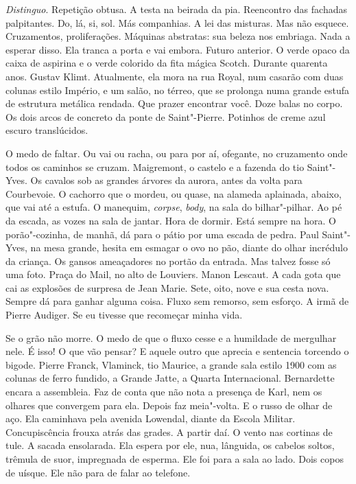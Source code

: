 \emph{Distinguo}. Repetição obtusa. A testa na beirada da pia.
Reencontro das fachadas palpitantes. Do, lá, si, sol. Más companhias. A %
lei das misturas. Mas não esquece. Cruzamentos, proliferações. Máquinas
abstratas: sua beleza nos embriaga. Nada a esperar disso. Ela tranca a
porta e vai embora. Futuro anterior. O verde opaco da caixa de aspirina
e o verde colorido da fita mágica Scotch. Durante quarenta anos. Gustav
Klimt. Atualmente, ela mora na rua Royal, num casarão com duas colunas
estilo Império, e um salão, no térreo, que se prolonga numa grande
estufa de estrutura metálica rendada. Que prazer encontrar você. Doze
balas no corpo. Os dois arcos de concreto da ponte de Saint"-Pierre.
Potinhos de creme azul escuro translúcidos.

O medo de faltar. Ou vai ou racha, ou para por aí, ofegante, no
cruzamento onde todos os caminhos se cruzam. Maigremont, o castelo e a
fazenda do tio Saint"-Yves. Os cavalos sob as grandes árvores da aurora,
antes da volta para Courbevoie. O cachorro que o mordeu, ou quase, na
alameda aplainada, abaixo, que vai até a estufa. O manequim,
\emph{corpse}, \emph{body}, na sala do bilhar"-pilhar. Ao pé da escada,
as vozes na sala de jantar. Hora de dormir. Está sempre na hora. O
porão"-cozinha, de manhã, dá para o pátio por uma escada de pedra. Paul
Saint"-Yves, na mesa grande, hesita em esmagar o ovo no pão, diante do
olhar incrédulo da criança. Os gansos ameaçadores no portão da entrada.
Mas talvez fosse só uma foto. Praça do Mail, no alto de Louviers. Manon
Lescaut. A cada gota que cai as explosões de surpresa de Jean Marie.
Sete, oito, nove e sua cesta nova. Sempre dá para ganhar alguma coisa.
Fluxo sem remorso, sem esforço. A irmã de Pierre Audiger. Se eu tivesse
que recomeçar minha vida.

Se o grão não morre. O medo de que o fluxo cesse e a humildade de
mergulhar nele. É isso! O que vão pensar? E aquele outro que aprecia e
sentencia torcendo o bigode. Pierre Franck, Vlaminck, tio Maurice, a
grande sala estilo 1900 com as colunas de ferro fundido, a Grande Jatte,
a Quarta Internacional. Bernardette encara a assembleia. Faz de conta
que não nota a presença de Karl, nem os olhares que convergem para ela.
Depois faz meia"-volta. E o russo de olhar de aço. Ela caminhava pela
avenida Lowendal, diante da Escola Militar. Concupiscência frouxa atrás
das grades. A partir daí. O vento nas cortinas de tule. A sacada
ensolarada. Ela espera por ele, nua, lânguida, os cabelos soltos,
trêmula de suor, impregnada de esperma. Ele foi para a sala ao lado.
Dois copos de uísque. Ele não para de falar ao telefone.

